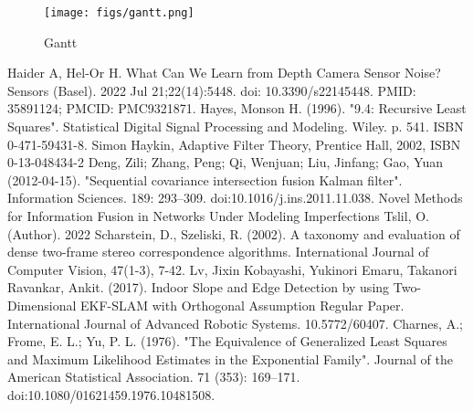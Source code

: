 \documentclass[12pt,a4paper,oneside,onecolumn]{book}
\begin{document}

\vspace{1cm}
\begin{figure}[H]
    \centering
    \texttt{[image: figs/gantt.png]}
    \caption{Gantt}
\end{figure}








\nocite{*}

% 
\begin{thebibliography}{9}
Haider A, Hel-Or H. What Can We Learn from Depth Camera Sensor Noise? Sensors (Basel). 2022 Jul 21;22(14):5448. doi: 10.3390/s22145448. PMID: 35891124; PMCID: PMC9321871.
Hayes, Monson H. (1996). "9.4: Recursive Least Squares". Statistical Digital Signal Processing and Modeling. Wiley. p. 541. ISBN 0-471-59431-8.
Simon Haykin, Adaptive Filter Theory, Prentice Hall, 2002, ISBN 0-13-048434-2
Deng, Zili; Zhang, Peng; Qi, Wenjuan; Liu, Jinfang; Gao, Yuan (2012-04-15). "Sequential covariance intersection fusion Kalman filter". Information Sciences. 189: 293–309. doi:10.1016/j.ins.2011.11.038.
Novel Methods for Information Fusion in Networks Under Modeling Imperfections
Tslil, O. (Author). 2022
Scharstein, D.,  Szeliski, R. (2002). A taxonomy and evaluation of dense two-frame stereo correspondence algorithms. International Journal of Computer Vision, 47(1-3), 7-42.
Lv, Jixin  Kobayashi, Yukinori  Emaru, Takanori  Ravankar, Ankit. (2017). Indoor Slope and Edge Detection by using Two-Dimensional EKF-SLAM with Orthogonal Assumption Regular Paper. International Journal of Advanced Robotic Systems. 10.5772/60407. 
Charnes, A.; Frome, E. L.; Yu, P. L. (1976). "The Equivalence of Generalized Least Squares and Maximum Likelihood Estimates in the Exponential Family". Journal of the American Statistical Association. 71 (353): 169–171. doi:10.1080/01621459.1976.10481508.

\end{thebibliography}
\end{document}
